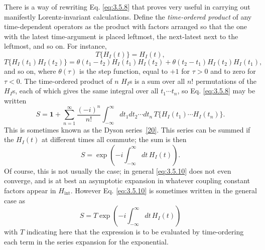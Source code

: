 There is a way of rewriting Eq. \eqref{eq:3.5.8} that proves very useful in carrying out manifestly
Lorentz-invariant calculations. Define the \emph{time-ordered product} of any time-dependent
operators as the product with factors arranged so that the one with the latest time-argument
is placed leftmost, the next-latest next to the leftmost, and so on. For instance,
\[
 T\{H_I(t)\}=H_I(t),
\]
\[
 T\{H_I(t_1)H_I(t_2)\}=\theta(t_1-t_2)H_I(t_1)H_I(t_2)
 +\theta(t_2-t_1)H_I(t_2)H_I(t_1),
\]
and so on, where $\theta(\tau)$ is the step function, equal to $+1$ for $\tau>0$ and to zero
for $\tau<0$. The time-ordered product of $n$ $H_I$s is a sum over all $n!$ permutations of
the $H_I$s, each of which gives the same integral over all $t_1\cdots t_n$, so Eq. \eqref{eq:3.5.8}
may be written
\begin{equation}
 S=\mathbf{1}+\sum_{n=1}^{\infty}\frac{(-i)^n}{n!}
 \int_{-\infty}^{\infty}dt_1dt_2\cdots dt_n\,
 T\{H_I(t_1)\cdots H_I(t_n)\}.
 \tag{3.5.10}\label{eq:3.5.10}
\end{equation}
This is sometimes known as the Dyson series~\hyperref[ref:3.20]{[20]}. This series can be summed if the $H_I(t)$
at different times all commute; the sum is then
\[
 S=\exp\left(-i\int_{-\infty}^{\infty}dt\,H_I(t)\right).
\]
Of course, this is not usually the case; in general \eqref{eq:3.5.10} does not even converge, and is at
best an asymptotic expansion in whatever coupling constant factors appear in $H_{\mathrm{int}}$.
However Eq. \eqref{eq:3.5.10} is sometimes written in the general case as
\[
 S=T\exp\left(-i\int_{-\infty}^{\infty}dt\,H_I(t)\right)
\]
with $T$ indicating here that the expression is to be evaluated by time-ordering each term in
the series expansion for the exponential.

